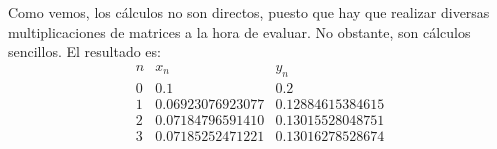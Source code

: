 \begin{ejercicio}
\begin{enumerate}
        Como vemos, los cálculos no son directos, puesto que hay que realizar diversas multiplicaciones de matrices a la hora de evaluar. No obstante, son cálculos sencillos. El resultado es:
        \begin{equation*}
            \begin{array}{c|c|c}
                n & x_n & y_n\\ \hline
                0 & 0.1 & 0.2\\
                1 & 0.06923076923077 & 0.12884615384615\\
                2 & 0.07184796591410 & 0.13015528048751\\
                3 & 0.07185252471221 & 0.13016278528674
            \end{array}
        \end{equation*}

    \end{enumerate}
\end{ejercicio}